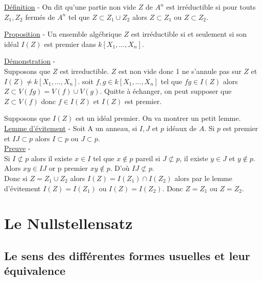 \documentclass[10pt, twoside]{article}
\theoremstyle{plain}
\theoremstyle{definition}
\theoremstyle{plain}
\theoremstyle{plain}
\theoremstyle{definition}
\theoremstyle{remark}
\begin{document}
\underline{Définition} - On dit qu'une partie non vide $Z$ de $A^n$ est irréductible si pour touts $Z_1, Z_2$ fermés de $A^n$ tel que $Z \subset Z_1 \cup Z_2$ alors $Z\subset Z_1$ ou $Z \subset Z_2$.

\underline{Proposition} - Un ensemble algébrique $Z$ est irréductible si et seulement si son idéal $I(Z)$ est premier dans $k[X_{1},...,X_{n}]$.

\underline{Démonstration} - \\ Supposons que $Z$ est irreductible. $Z$ est non vide donc 1 ne s'annule pas sur $Z$ et $I(Z) \neq k[X_{1},...,X_{n}]$. soit $f,g \in k[X_{1},...,X_{n}]$ tel que $fg \in I(Z)$ alors $Z \subset V(fg) = V(f) \cup V(g) $. Quitte à échanger, on peut supposer que $Z \subset V(f)$ donc $f \in I(Z)$ et $I(Z)$ est premier.

Supposons que $I(Z)$ est un idéal premier. On va montrer un petit lemme. \\
\underline{Lemme d'évitement} - Soit A un anneau, si $I,J$ et $p$ idéaux de $ A$. Si $p$ est premier et $IJ\subset p$ alors $I \subset p$ ou $J\subset p$.
\\ \underline{Preuve} - \\ Si $ I \not\subset p$ alors il existe $x \in I$ tel que $x \not\in p$ pareil si $J \not\subset p$, il existe $y\in J$ et $y \not\in p$. Alors $xy \in IJ $ or p premier $xy \not\in p$. D'où $IJ \not\subset p$.
\\ Donc si $Z = Z_1 \cup Z_2$ alors $I(Z) = I(Z_1) \cap I(Z_2) $ alors par le lemme d'évitement $I(Z)= I(Z_1)$ ou $I(Z)= I(Z_2)$. Donc $Z= Z_1$ ou $Z = Z_2$.

\section{Le Nullstellensatz}

\subsection{Le sens des différentes formes usuelles et leur équivalence}
\end{document}
